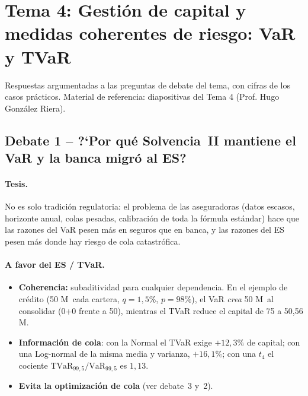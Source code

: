 \documentclass[a4paper,12pt]{article}
\newcommand{\euro}{\texteuro}
\newcommand{\VaR}{\mathrm{VaR}}
\newcommand{\TVaR}{\mathrm{TVaR}}
\begin{document}
\restoregeometry
\newpage
{}
\setcounter{page}{1}

\section{Tema 4: Gestión de capital y medidas coherentes de riesgo: VaR y TVaR}
\label{sec:tema4debate}
\noindent
Respuestas argumentadas a las preguntas de debate del tema, con cifras de los casos prácticos. Material de referencia: diapositivas del Tema 4 (Prof. Hugo González Riera).

\subsection{Debate 1 -- ?`Por qu\'e Solvencia~II mantiene el VaR y la banca migr\'o al ES?}

\paragraph{Tesis.} No es solo tradici\'on regulatoria: el problema de las aseguradoras (datos escasos, horizonte anual, colas pesadas, calibraci\'on de toda la f\'ormula est\'andar) hace que las razones del VaR pesen m\'as en seguros que en banca, y las razones del ES pesen m\'as donde hay riesgo de cola catastr\'ofica.

\paragraph{A favor del ES / TVaR.}
\begin{itemize}[leftmargin=*,itemsep=1pt]
\item \textbf{Coherencia:} subaditividad para cualquier dependencia. En el ejemplo de cr\'edito (50 M\euro\ cada cartera, $q=1{,}5\%$, $p=98\%$), el VaR \emph{crea} 50 M\euro\ al consolidar (0+0 frente a 50), mientras el TVaR reduce el capital de 75 a 50,56 M\euro.
\item \textbf{Informaci\'on de cola}: con la Normal el TVaR exige $+12{,}3\%$ de capital; con una Log-normal de la misma media y varianza, $+16{,}1\%$; con una $t_4$ el cociente $\TVaR_{99,5}/\VaR_{99,5}$ es $1{,}13$.
\item \textbf{Evita la optimizaci\'on de cola} (ver debate~3 y~2).
\end{itemize}
\end{document}
